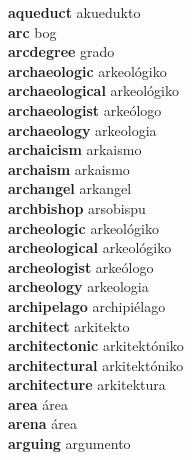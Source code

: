 \textbf{aqueduct } akuedukto \\
\textbf{arc } bog \\
\textbf{arcdegree } grado \\
\textbf{archaeologic } arkeológiko \\
\textbf{archaeological } arkeológiko \\
\textbf{archaeologist } arkeólogo \\
\textbf{archaeology } arkeologia \\
\textbf{archaicism } arkaismo \\
\textbf{archaism } arkaismo \\
\textbf{archangel } arkangel \\
\textbf{archbishop } arsobispu \\
\textbf{archeologic } arkeológiko \\
\textbf{archeological } arkeológiko \\
\textbf{archeologist } arkeólogo \\
\textbf{archeology } arkeologia \\
\textbf{archipelago } archipiélago \\
\textbf{architect } arkitekto \\
\textbf{architectonic } arkitektóniko \\
\textbf{architectural } arkitektóniko \\
\textbf{architecture } arkitektura \\
\textbf{area } área \\
\textbf{arena } área \\
\textbf{arguing } argumento \\
